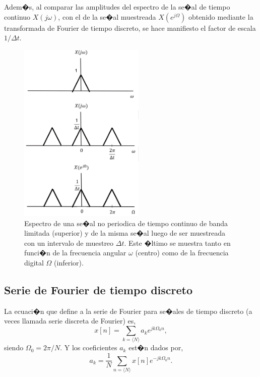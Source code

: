\documentclass[10pt,a4paper]{article}
\begin{document}
Adem�s, al comparar las amplitudes del espectro de la se�al de tiempo continuo $X(j\omega)$, con el de la se�al 
muestreada $X(e^{j\Omega})$ obtenido mediante la transformada 
de Fourier de tiempo discreto, se hace manifiesto el factor de escala $1/\Delta t$.

\begin{figure}[h]
	\begin{center}
		\includegraphics[width=6cm]{frec_dig.png}
	\end{center}
	\caption{Espectro de una se�al no periodica de tiempo continuo de banda limitada (superior) y de la misma se�al 
		luego de ser 
		muestreada con un intervalo de muestreo $\Delta t$. Este �ltimo se muestra tanto en funci�n de la frecuencia 
		angular 
		$\omega$ (centro) como de la 
		frecuencia digital $\Omega$ (inferior).}
	\label{fig:frec_dig}
\end{figure}

\subsection*{Serie de Fourier de tiempo discreto}
La ecuaci�n que define a la serie de Fourier para se�ales de tiempo discreto (a veces llamada serie discreta de Fourier) es,
\begin{equation}
x[n] = \sum_{k=\langle N\rangle} a_k e^{jk\Omega_0n},
\end{equation}
siendo $\Omega_0=2\pi/N$. Y los coeficientes $a_k$ est�n dados por,
\begin{equation}
a_k = \frac{1}{N} \sum_{n=\langle N\rangle} x[n]e^{-jk\Omega_0n}.
\end{equation}
\end{document}
